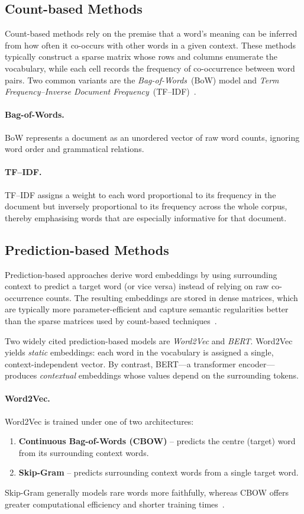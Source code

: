 \documentclass{SGGW-thesis-EN}
\begin{document}
\subsection{Count-based Methods}

Count-based methods rely on the premise that a word’s meaning can be inferred from how often it
co-occurs with other words in a given context.
These methods typically construct a sparse matrix whose rows and columns enumerate the
vocabulary, while each cell records the frequency of co-occurrence between word pairs.
Two common variants are the \textit{Bag-of-Words}~(BoW) model and \textit{Term Frequency–Inverse
Document Frequency}~(TF–IDF)~\cite{jurafsky2023slp3}.
\paragraph{Bag-of-Words.}
BoW represents a document as an unordered vector of raw word counts, ignoring word order and
grammatical relations.

\paragraph{TF–IDF.}
TF–IDF assigns a weight to each word proportional to its frequency in the document but inversely
proportional to its frequency across the whole corpus, thereby emphasising words that are
especially informative for that document.
\subsection{Prediction-based Methods}
Prediction-based approaches derive word embeddings by using surrounding context to predict a target word (or vice versa) instead of relying on raw co-occurrence counts.
The resulting embeddings are stored in dense matrices, which are typically more
parameter-efficient and capture semantic regularities better than the sparse matrices used by
count-based techniques~\cite{jurafsky2023slp3}.

Two widely cited prediction-based models are \textit{Word2Vec} and \textit{BERT}.
Word2Vec yields \emph{static} embeddings: each word in the vocabulary is assigned a single,
context-independent vector.
By contrast, BERT—a transformer encoder—produces \emph{contextual} embeddings whose values depend
on the surrounding tokens.

\paragraph{Word2Vec.}
Word2Vec is trained under one of two architectures:
\begin{enumerate}
  \item \textbf{Continuous Bag-of-Words (CBOW)} – predicts the centre (target) word from its surrounding
        context words.
  \item \textbf{Skip-Gram} – predicts surrounding context words from a single target word.
\end{enumerate}
Skip-Gram generally models rare words more faithfully, whereas CBOW offers greater computational
efficiency and shorter training times~\cite{mikolov2013distributed}.
\end{document}
